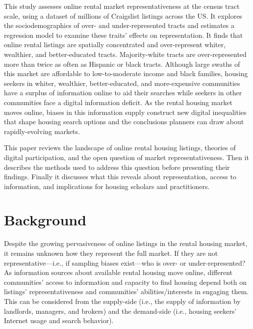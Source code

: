 \documentclass[11pt,onecolumn]{article} %
\begin{document}
This study assesses online rental market representativeness at the census tract scale, using a dataset of millions of Craigslist listings across the US. It explores the sociodemographics of over- and under-represented tracts and estimates a regression model to examine these traits' effects on representation. It finds that online rental listings are spatially concentrated and over-represent whiter, wealthier, and better-educated tracts. Majority-white tracts are over-represented more than twice as often as Hispanic or black tracts. Although large swaths of this market are affordable to low-to-moderate income and black families, housing seekers in whiter, wealthier, better-educated, and more-expensive communities have a surplus of information online to aid their searches while seekers in other communities face a digital information deficit. As the rental housing market moves online, biases in this information supply construct new digital inequalities that shape housing search options and the conclusions planners can draw about rapidly-evolving markets.

This paper reviews the landscape of online rental housing listings, theories of digital participation, and the open question of market representativeness. Then it describes the methods used to address this question before presenting their findings. Finally it discusses what this reveals about representation, access to information, and implications for housing scholars and practitioners.




\section{Background}

Despite the growing pervasiveness of online listings in the rental housing market, it remains unknown how they represent the full market. If they are not representative---i.e., if sampling biases exist---who is over- or under-represented? As information sources about available rental housing move online, different communities' access to information and capacity to find housing depend both on listings' representativeness and communities' abilities/interests in engaging them. This can be considered from the supply-side (i.e., the supply of information by landlords, managers, and brokers) and the demand-side (i.e., housing seekers' Internet usage and search behavior).
\end{document}
